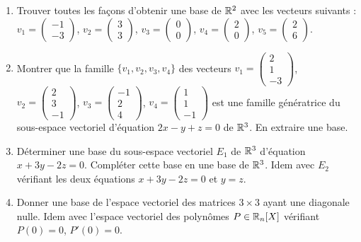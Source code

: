 \begin{frame}
\begin{miniexercice}
\begin{enumerate}
  \item Trouver toutes les façons d'obtenir une base de $\mathbb{R}^2$ 
  avec les vecteurs suivants :
  $v_1=\left(\begin{smallmatrix}-1\\-3\end{smallmatrix}\right)$, 
  $v_2=\left(\begin{smallmatrix}3\\3\end{smallmatrix}\right)$, 
  $v_3=\left(\begin{smallmatrix}0\\0\end{smallmatrix}\right)$, 
  $v_4=\left(\begin{smallmatrix}2\\0\end{smallmatrix}\right)$, 
  $v_5=\left(\begin{smallmatrix}2\\6\end{smallmatrix}\right)$.
          
  
  \item Montrer que la famille $\{ v_1, v_2, v_3, v_4\}$ des vecteurs
  $v_1=\left(\begin{smallmatrix}2\\1\\-3\end{smallmatrix}\right)$,
  $v_2=\left(\begin{smallmatrix}2\\3\\-1\end{smallmatrix}\right)$,
  $v_3=\left(\begin{smallmatrix}-1\\2\\4\end{smallmatrix}\right)$,
  $v_4=\left(\begin{smallmatrix}1\\1\\-1\end{smallmatrix}\right)$ 
  est une famille génératrice du sous-espace vectoriel d'équation $2x-y+z=0$ de $\mathbb{R}^3$.
  En extraire une base.

  \item Déterminer une base du sous-espace vectoriel $E_1$ de $\mathbb{R}^3$ d'équation
  $x+3y-2z=0$. Compléter cette base en une base de $\mathbb{R}^3$. 
  Idem avec $E_2$ vérifiant les deux équations $x+3y-2z=0$ et $y=z$.
  
  \item Donner une base de l'espace vectoriel des matrices $3\times 3$ ayant une diagonale
  nulle. Idem avec l'espace vectoriel des polynômes $P \in \mathbb{R}_n[X]$ vérifiant 
  $P(0)=0$, $P'(0)=0$. 
  
\end{enumerate}
\end{miniexercice}
\end{frame}


